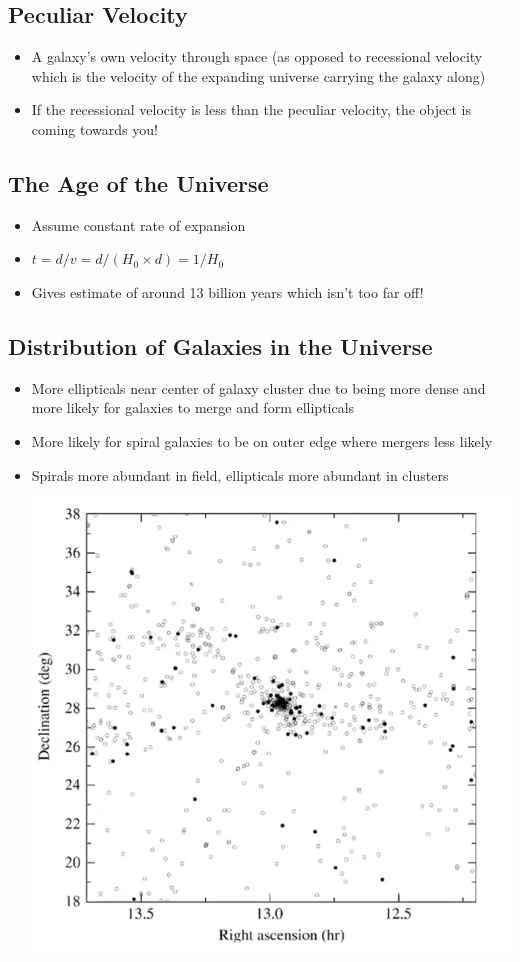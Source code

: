\documentclass{book}
\begin{document}
\subsection{Peculiar Velocity}
\begin{itemize}
    \item A galaxy's own velocity through space (as opposed to recessional velocity which is the velocity of the expanding universe carrying the galaxy along)
    \item If the recessional velocity is less than the peculiar velocity, the object is coming towards you!
\end{itemize}
\subsection{The Age of the Universe}
\begin{itemize}
    \item Assume constant rate of expansion
    \item $t = d/v = d / (H_0 \times d) = 1 / H_0$
    \item Gives estimate of around 13 billion years which isn't too far off!
\end{itemize}
\subsection{Distribution of Galaxies in the Universe}
\begin{itemize}
    \item More ellipticals near center of galaxy cluster due to being more dense and more likely for galaxies to merge and form ellipticals
    \item More likely for spiral galaxies to be on outer edge where mergers less likely
    \item Spirals more abundant in field, ellipticals more abundant in clusters
          \begin{center}
              \includegraphics[height=0.5\textwidth]{images/distro_galax.png}
          \end{center}
\end{itemize}
\end{document}
